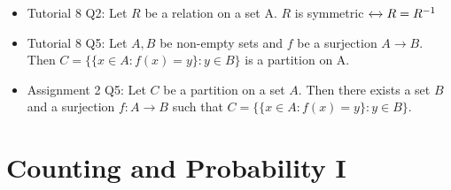 \documentclass{article}
\begin{document}
\begin{itemize}
\begin{center}
        \end{center}
    \item Tutorial 8 Q2: Let $R$ be a relation on a set A. $R$ is symmetric $\xleftrightarrow{} R=R^{-1}$
    \item Tutorial 8 Q5: Let $A,B$ be non-empty sets and $f$ be a surjection $A \xrightarrow{} B$. Then $C = \{\{x \in A : f(x)=y\}:y \in B\}$ is a partition on A.
    \item Assignment 2 Q5: Let $C$ be a partition on a set $A$. Then there exists a set $B$ and a surjection $f : A \xrightarrow{} B$ such that $C = \{\{x \in A : f(x)=y\} : y \in B\}$.
\end{itemize}

\section*{Counting and Probability I}
\end{document}

